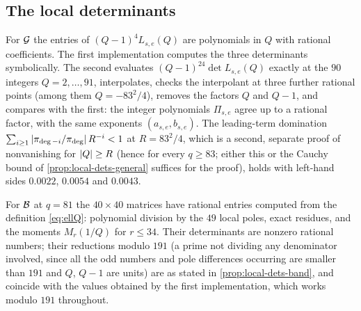\subsection{The local determinants}\label{app:local-certificates}

For $\mathcal{G}$ the entries of $(Q-1)^4L_{s,e}(Q)$ are polynomials in $Q$ with rational
coefficients. The first implementation computes the three determinants symbolically. The second
evaluates $(Q-1)^{24}\det L_{s,e}(Q)$ exactly at the $90$ integers $Q=2,\dots,91$, interpolates,
checks the interpolant at three further rational points (among them $Q=-83^2/4$), removes the
factors $Q$ and $Q-1$, and compares with the first: the integer polynomials $\Pi_{s,e}$ agree up
to a rational factor, with the same exponents $(a_{s,e},b_{s,e})$. The leading-term domination
$\sum_{i\ge1}\left\lvert \pi_{\deg-i}/\pi_{\deg}\right\rvert R^{-i}<1$ at $R=83^2/4$, which is a second, separate proof of
nonvanishing for $\left\lvert Q\right\rvert\ge R$ (hence for every $q\ge83$; either this or the Cauchy bound of
\cref{prop:local-dets-general} suffices for the proof), holds with left-hand sides $0.0022$, $0.0054$ and $0.0043$.

For $\mathcal{B}$ at $q=81$ the $40\times40$ matrices have rational entries computed from the definition
\eqref{eq:ellQ}: polynomial division by the $49$ local poles, exact residues, and the moments
$M_r(1/Q)$ for $r\le34$. Their determinants are nonzero rational numbers; their reductions
modulo $191$ (a prime not dividing any denominator involved, since all the odd numbers and pole
differences occurring are smaller than $191$ and $Q$, $Q-1$ are units) are as stated in
\cref{prop:local-dets-band}, and coincide with the values obtained by the first implementation,
which works modulo $191$ throughout.
